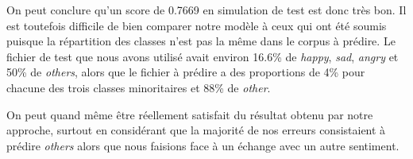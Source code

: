 On peut conclure qu'un score de 0.7669 en simulation de test est donc très bon. Il est toutefois difficile de bien comparer notre modèle à ceux qui ont été soumis puisque la répartition des classes n'est pas la même dans le corpus à prédire. Le fichier de test que nous avons utilisé avait environ 16.6\% de \emph{happy}, \emph{sad}, \emph{angry} et 50\% de \emph{others}, alors que le fichier à prédire a des proportions de 4\% pour chacune des trois classes minoritaires et 88\% de \emph{other}. 

On peut quand même être réellement satisfait du résultat obtenu par notre approche, surtout en considérant que la majorité de nos erreurs consistaient à prédire \emph{others} alors que nous faisions face à un échange avec un autre sentiment.